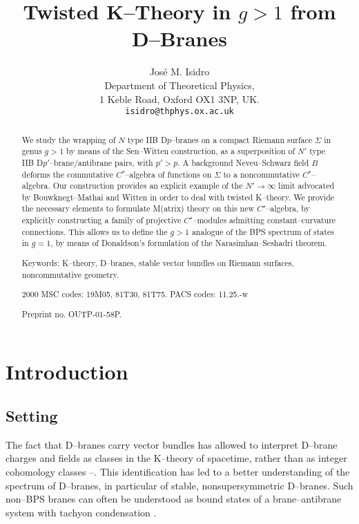 \documentclass[a4paper,a4paper]{article}
\begin{document}
\title{Twisted K--Theory in $g>1$ from D--Branes}

\author{Jos\'e M. Isidro\\
Department of Theoretical Physics,\\ 
1 Keble Road, 
Oxford OX1 3NP, UK.\\ 
{\tt isidro@thphys.ox.ac.uk}}
\maketitle

\begin{abstract}
We study the wrapping of $N$ type IIB D$p$--branes on a compact Riemann 
surface $\Sigma$ in genus $g>1$ by means of the Sen--Witten construction, 
as a superposition of $N'$ type IIB D$p'$--brane/antibrane pairs, 
with $p'>p$. A background Neveu--Schwarz field $B$ deforms the commutative 
$C^{\star}$--algebra of functions on $\Sigma$ to a noncommutative $C^{\star}$--algebra.
Our construction provides an explicit example of the $N'\to\infty$ limit 
advocated by Bouwknegt--Mathai and Witten 
in order to deal with twisted K--theory. We provide the necessary 
elements to formulate M(atrix) theory on this new $C^{\star}$--algebra, by
explicitly constructing a family of projective $C^{\star}$--modules admitting 
constant--curvature connections. This allows us to define the $g>1$ analogue
of the BPS spectrum of states in $g=1$, by means of Donaldson's formulation 
of the Narasimhan--Seshadri theorem. 

Keywords: K--theory, D--branes, stable vector bundles on Riemann surfaces, noncommutative 
geometry.

2000 MSC codes: 19M05, 81T30, 81T75. PACS codes: 11.25.-w

Preprint no. OUTP-01-58P.

\end{abstract}

\tableofcontents

\section{Introduction}\label{intro}  
  
\subsection{Setting}\label{set}  
  
The fact that D--branes carry vector bundles has allowed to  
interpret D--brane  charges and fields as classes in the K--theory
of spacetime, rather than as integer cohomology classes 
\cite{MINASIANMOORE}--\cite{MALDAMOOSEI}. This identification  
has led  to a better understanding of the spectrum of D--branes, 
in particular of  stable, nonsupersymmetric D--branes. Such non--BPS  
branes can often be  understood as bound states of a  
brane--antibrane system with tachyon condensation \cite{SEN}. 
 
\end{document}
